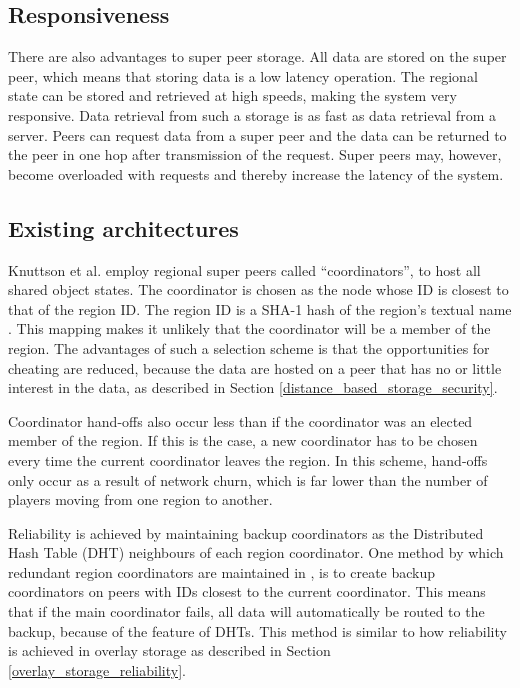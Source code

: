 \subsection{Responsiveness}
There are also advantages to super peer storage. All data are stored on the super peer, which means that storing data is a low latency operation. The
regional state can be stored and retrieved at high speeds, making the system very responsive. Data retrieval from such a storage is as fast as data
retrieval from a server. Peers can request data from a super peer and the data can be returned to the peer in one hop after transmission of the
request. Super peers may, however, become overloaded with requests and thereby increase the latency of the system.

\subsection{Existing architectures}

Knuttson et al. \cite{knutsson_p2p_first} employ regional super peers called ``coordinators'', to host all shared object states. The coordinator is
chosen as the node whose ID is closest to that of the region ID. The region ID is a SHA-1 hash of the region's textual name \cite{SHA}. This mapping
makes it unlikely that the coordinator will be a member of the region. The advantages of such a selection scheme is that the opportunities for
cheating are reduced, because the data are hosted on a peer that has no or little interest in the data, as described in Section
\ref{distance_based_storage_security}.

Coordinator hand-offs also occur less than if the coordinator was an elected member of the region. If this is the case, a new coordinator has to be
chosen every time the current coordinator leaves the region. In this scheme, hand-offs only occur as a result of network churn, which is far lower
than the number of players moving from one region to another.

Reliability is achieved by maintaining backup coordinators as the Distributed Hash Table (DHT) neighbours of each region coordinator. One method by
which redundant region coordinators are maintained in \cite{knutsson_p2p_first}, is to create backup coordinators on peers with IDs closest to the
current coordinator. This means that if the main coordinator fails, all data will automatically be routed to the backup, because of the feature of
DHTs. This method is similar to how reliability is achieved in overlay storage as described in Section \ref{overlay_storage_reliability}.

